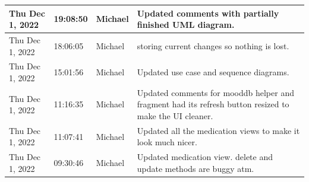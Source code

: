\documentclass[11pt]{article}
\begin{document}
\begin{center}
\begin{longtable}{|p{2.7cm}|l|p{2cm}|p{8cm}|}
           \hline Thu Dec 1, 2022                            & 19:08:50                           & Michael                                 & Updated comments with partially finished UML diagram.                                                                                                                                                                                                                                                      \\
           \hline Thu Dec 1, 2022                            & 18:06:05                           & Michael                                 & storing current changes so nothing is lost.                                                                                                                                                                                                                                                                \\
           \hline Thu Dec 1, 2022                            & 15:01:56                           & Michael                                 & Updated use case and sequence diagrams.                                                                                                                                                                                                                                                                    \\
           \hline Thu Dec 1, 2022                            & 11:16:35                           & Michael                                 & Updated comments for mooddb helper and fragment had its refresh button resized to make the UI cleaner.                                                                                                                                                                                                     \\
           \hline Thu Dec 1, 2022                            & 11:07:41                           & Michael                                 & Updated all the medication views to make it look much nicer.                                                                                                                                                                                                                                               \\
           \hline Thu Dec 1, 2022                            & 09:30:46                           & Michael                                 & Updated medication view. delete and update methods are buggy atm.                                                                                                                                                                                                                                          \\

\end{longtable}
\end{center}
\end{document}
